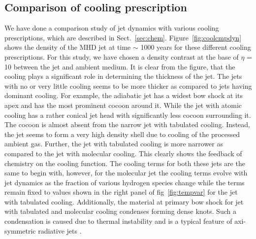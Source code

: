 \documentclass[useAMS,usenatbib,letters]{mn2e}
\begin{document}
\subsection{Comparison of cooling prescription}
\label{ssec:coolres}
We have done a comparison study of jet dynamics with various cooling
prescriptions, which are described in
Sect.~\ref{sec:chem}. Figure~\ref{fig:coolcmpdyn} shows the density of the MHD
jet at time $\sim$ 1000 years for these different cooling
prescriptions. For this study, we have chosen a density contrast at the base of
$\eta$ = 10 between the jet and ambient medium.
It is clear from the figure, that the cooling plays a
significant role in determining the thickness of the jet. The jets
with no or very little cooling seems to be more thicker as compared to
jets having dominant cooling. For example, the adiabatic jet
has a widest bow shock at its apex and has the most prominent cocoon
around it. While the jet with atomic cooling has a rather conical
jet head with significantly less cocoon surrounding it. The cocoon is
almost absent from the narrow jet with tabulated cooling. Instead, the jet
seems to form a very high density shell due to cooling of the
processed ambient gas. Further, the jet with tabulated cooling is more
narrower as compared to the jet with molecular cooling. This clearly
shows the feedback of chemistry on the cooling function. The cooling
terms for both these jets are the same to begin with, however,
for the molecular jet the cooling terms evolve with jet dynamics as the fraction of
various hydrogen species change while the terms remain fixed to values
shown in the right panel of fig~\ref{fig:tempvar} for the jet with tabulated
cooling. Additionally, the material at primary bow shock for jet
with tabulated and molecular cooling condenses forming dense knots. 
Such a condensation is caused due to thermal instability and is 
a typical feature of axi-symmetric radiative jets 
\citep[see, for e.g,][]{Blondin:1990p2130,Cerqueira:1999p15052}.
%
\end{document}
